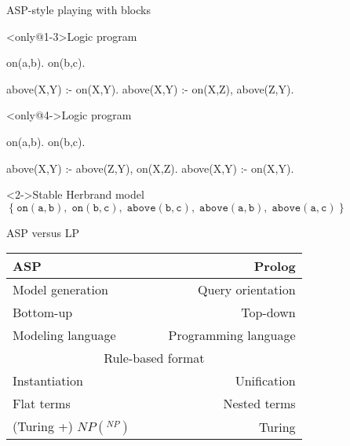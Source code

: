 \begin{frame}[fragile]{ASP-style playing with blocks}
  \begin{block}<only@1-3>{Logic program}%
    \small\vspace{-2ex}%
\begin{semiverbatim}
on(a,b).
on(b,c).

above(X,Y) :- on(X,Y).
above(X,Y) :- on(X,Z), above(Z,Y).
\end{semiverbatim}
  \end{block}
  \begin{block}<only@4->{Logic program}%
    \small\vspace{-2ex}%
\begin{semiverbatim}
on(a,b).
on(b,c).

above(X,Y) :- above(Z,Y), on(X,Z).
above(X,Y) :- on(X,Y).
\end{semiverbatim}
  \end{block}
  \begin{block}<2->{Stable Herbrand model\phantom{)}}
    \medskip
      \(\
      \{\ \mathtt{on(a,b),\; on(b,c),\; above(b,c),\; above(a,b),\; above(a,c)}\ \}
      \)
    \bigskip
  \end{block}
\end{frame}
\begin{frame}[c]{ASP versus LP}
  \begin{center}\renewcommand{\arraystretch}{1.2}
    \begin{tabular}{lc|cr}
      \alert{ASP}                           &&& \alert{Prolog}\\
      \hline\hline
      Model generation                      &&&    Query orientation\\\hline
      Bottom-up                             &&&             Top-down\\\hline
      Modeling language                     &&& Programming language\\\hline
      \multicolumn{4}{c}{Rule-based format}\\
      \hspace*{12pt} Instantiation          &&&     Unification \hspace*{12pt} \\[-3pt]
      \hspace*{12pt} Flat terms             &&&    Nested terms \hspace*{12pt} \\\hline
      {\footnotesize (Turing +)} $NP(^{NP})$&&& Turing
    \end{tabular}
  \end{center}
\end{frame}

